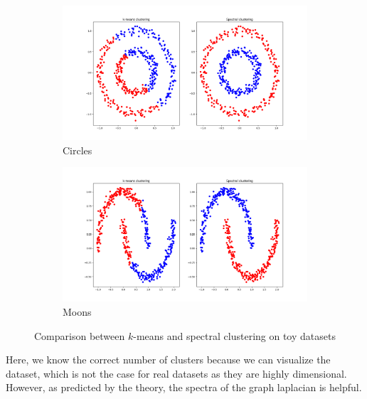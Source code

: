 \documentclass[a4paper,12pt]{article}
\theoremstyle{definition}
\theoremstyle{plain}
\begin{document}
\begin{figure}[H]
	\centering
	\begin{subfigure}[b]{0.6\textwidth} %
		\centering
		\includegraphics[width=\linewidth]{figures/Fig1} %
		\caption{Circles}
	\end{subfigure}
	\hspace{0.05\textwidth} %
	\begin{subfigure}[b]{0.6\textwidth} %
		\centering
		\includegraphics[width=\linewidth]{figures/Fig2} %
		\caption{Moons}
	\end{subfigure}
	\caption{Comparison between $k$-means and spectral clustering on toy datasets}
\end{figure}


Here, we know the correct number of clusters because we can visualize the dataset, which is not the case for real datasets as they are highly dimensional. However, as predicted by the theory, the spectra of the graph laplacian is helpful.
\end{document}
